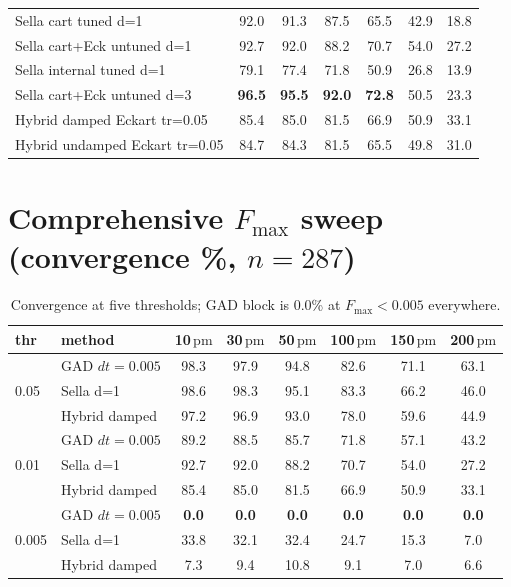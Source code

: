 \documentclass[11pt]{article}
\newcommand{\fmax}{\ensuremath{F_{\mathrm{max}}}}
\renewcommand{\pm}{\ensuremath{\,\text{pm}}}
\begin{document}
\begin{table}[H]
\begin{tabular}{l cccccc}
Sella cart tuned d=1          & 92.0 & 91.3 & 87.5 & 65.5 & 42.9 & 18.8 \\
Sella cart+Eck untuned d=1    & 92.7 & 92.0 & 88.2 & 70.7 & 54.0 & 27.2 \\
Sella internal tuned d=1      & 79.1 & 77.4 & 71.8 & 50.9 & 26.8 & 13.9 \\
Sella cart+Eck untuned d=3    & \textbf{96.5} & \textbf{95.5} & \textbf{92.0} & \textbf{72.8} & 50.5 & 23.3 \\
Hybrid damped Eckart tr=0.05  & 85.4 & 85.0 & 81.5 & 66.9 & 50.9 & 33.1 \\
Hybrid undamped Eckart tr=0.05& 84.7 & 84.3 & 81.5 & 65.5 & 49.8 & 31.0 \\
\bottomrule
\end{tabular}
\end{table}

\section{Comprehensive \texorpdfstring{$\fmax$}{Fmax} sweep (convergence \%, $n=287$)}\label{app:fmaxtable}
\begin{table}[H]\centering\footnotesize
\caption{Convergence at five thresholds; GAD block is 0.0\% at $\fmax<0.005$ everywhere.}
\begin{tabular}{ll cccccc}
\toprule
\textbf{thr} & \textbf{method} & \textbf{10\pm} & \textbf{30\pm} & \textbf{50\pm} & \textbf{100\pm} & \textbf{150\pm} & \textbf{200\pm} \\
\midrule
\multirow{3}{*}{0.05}
 & GAD $dt{=}0.005$ & 98.3 & 97.9 & 94.8 & 82.6 & 71.1 & 63.1 \\
 & Sella d=1        & 98.6 & 98.3 & 95.1 & 83.3 & 66.2 & 46.0 \\
 & Hybrid damped    & 97.2 & 96.9 & 93.0 & 78.0 & 59.6 & 44.9 \\
\midrule
\multirow{3}{*}{0.01}
 & GAD $dt{=}0.005$ & 89.2 & 88.5 & 85.7 & 71.8 & 57.1 & 43.2 \\
 & Sella d=1        & 92.7 & 92.0 & 88.2 & 70.7 & 54.0 & 27.2 \\
 & Hybrid damped    & 85.4 & 85.0 & 81.5 & 66.9 & 50.9 & 33.1 \\
\midrule
\multirow{3}{*}{0.005}
 & GAD $dt{=}0.005$ & \textbf{0.0} & \textbf{0.0} & \textbf{0.0} & \textbf{0.0} & \textbf{0.0} & \textbf{0.0} \\
 & Sella d=1        & 33.8 & 32.1 & 32.4 & 24.7 & 15.3 & 7.0 \\
 & Hybrid damped    & 7.3 & 9.4 & 10.8 & 9.1 & 7.0 & 6.6 \\
\bottomrule
\end{tabular}
\end{table}
\end{document}
